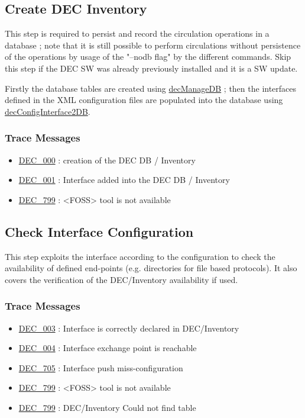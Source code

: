 \documentclass[dec_sum_main.tex]{subfiles}
\begin{document}
\subsection{Create DEC Inventory}
This step is required to persist and record the circulation operations in a database ; note that it is still possible to perform circulations without persistence of the operations by usage of the "--nodb flag" by the different commands. Skip this step if the DEC SW was already previously installed and it is a SW update.\newline

\par 
\noindent
Firstly the database tables are created using \hyperref[decManageDB]{decManageDB} ; then the interfaces defined in the XML configuration files are populated into the database using \hyperref[decConfigInterface2DB]{decConfigInterface2DB}.

\subsubsection{Trace Messages}

\begin{itemize}
    \item \hyperref[DEC000]{DEC\_000} : creation of the DEC DB / Inventory
    \item \hyperref[DEC001]{DEC\_001} : Interface added into the DEC DB / Inventory
    \item \hyperref[DEC799]{DEC\_799} : <FOSS> tool is not available
\end{itemize}

\subsection{Check Interface Configuration}
This step exploits the interface according to the configuration to check the availability of defined end-points (e.g. directories for file based protocols). It also covers the verification of the DEC/Inventory availability if used.

\subsubsection{Trace Messages}

\begin{itemize}
    \item \hyperref[DEC003]{DEC\_003} : Interface is correctly declared in DEC/Inventory
    \item \hyperref[DEC004]{DEC\_004} : Interface exchange point is reachable
    \item \hyperref[DEC705]{DEC\_705} : Interface push miss-configuration 
    \item \hyperref[DEC799]{DEC\_799} : <FOSS> tool is not available 
    \item \hyperref[DEC799]{DEC\_799} : DEC/Inventory Could not find table
\end{itemize}
\end{document}
